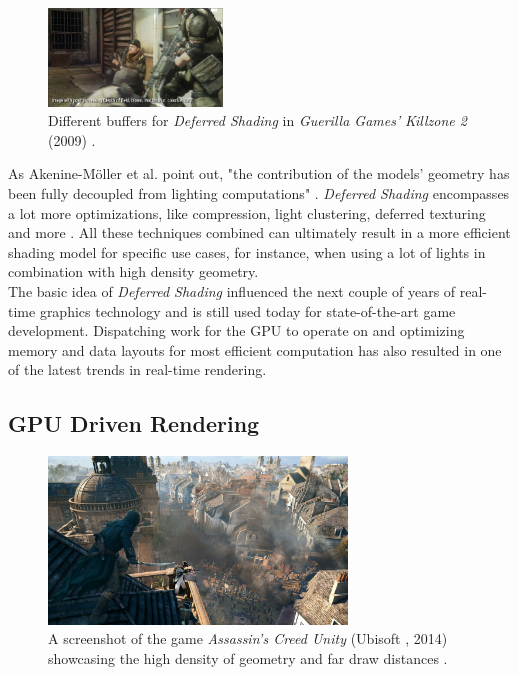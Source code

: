 \begin{figure}[h]
    \includegraphics[width=175px]{images/graphics/killzone-2-buffer-post.png}
    \caption{Different buffers for \emph{Deferred Shading} in \emph{Guerilla Games'} \emph{Killzone 2} (2009) 
    \cite{Valient2007}.}
    \label{fig:deferred-shading-buffers}
\end{figure}

\noindent
As Akenine-Möller et al. point out, "the contribution of the models’ geometry has been fully decoupled from lighting 
computations" \cite{AkenineMoeller2018}. \emph{Deferred Shading} encompasses a lot more optimizations, like compression, 
light clustering, deferred texturing and more \cite{AkenineMoeller2018}. All these techniques combined can ultimately 
result in a more efficient shading model for specific use cases, for instance, when using a lot of lights in combination 
with high density geometry.\\

\noindent
The basic idea of \emph{Deferred Shading} influenced the next couple of years of real-time graphics technology and is 
still used today for state-of-the-art game development. Dispatching work for the \ac{GPU} to operate on and optimizing 
memory and data layouts for most efficient computation has also resulted in one of the latest trends in real-time 
rendering.

\subsection*{GPU Driven Rendering}

\begin{figure}[h]
    \centering
    \includegraphics[width=300px]{images/graphics/assassins-creed-unity-gameplay.jpg}
    \caption{A screenshot of the game \emph{Assassin's Creed Unity} (Ubisoft \cite{Ubisoft2014}, 2014) 
    showcasing the high density of geometry and far draw distances \cite{Burke2014}.}
    \label{fig:assassins-creed-unity-gameplay}
\end{figure}

